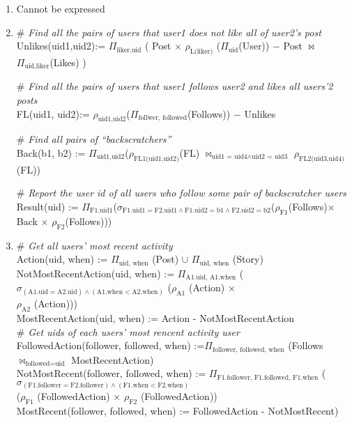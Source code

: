 \documentclass[letter, 9pt]{article}
\begin{document}
\begin{enumerate}
    \item Cannot be expressed

    \item {\color{gray} \# \textit{Find all the pairs of users that user1 does not like all of user2's post}} \\
    Unlikes(uid1,uid2):=
    $\Pi_{\text{liker,uid}}$
    (
        Post $\times$ $\rho_{\text{L(liker)}}$ ($\Pi_{\text{uid}}$(User)) $-$ 
        Post $\bowtie$ $\Pi_{\text{uid,liker}}$(Likes)
    ) 
    
    {\color{gray} \# \textit{Find all the pairs of users that user1 follows user2 and likes all users'2 posts}} \\
    FL(uid1, uid2):= $\rho_{\text{uid1,uid2}}$($\Pi_{\text{follwer, followed}}$(Follows)) $-$ Unlikes
    
    {\color{gray} \# \textit{Find all pairs of “backscratchers”}} \\
    Back(b1, b2) := $\Pi_{\text{uid1,uid2}}$($\rho_{\text{FL1(uid1,uid2)}}$(FL) $\bowtie_{\text{uid1 = uid4}\land \text{uid2 = uid3}}$ $\rho_{\text{FL2(uid3,uid4)}}$(FL)) 
    
    
    {\color{gray} \# \textit{Report the user id of all users who follow some pair of backscratcher users} \\}
    Result(uid) := $\Pi_{\text{F1.uid1}}$($\sigma_{\text{F1.uid1}=\text{F2.uid1} \land \text{F1.uid2} = \text{b1}\land \text{F2.uid2} = \text{b2}}$($\rho_{\text{F1}}$(Follows)$\times$ Back $\times$ $\rho_{\text{F2}}$(Follows)))
    
    \item {\color{gray} \# \textit{Get all users' most recent activity}} \\
    Action(uid, when) := $\Pi_{\text{uid, when}}$ (Post) $\cup$ $\Pi_{\text{uid, when}}$ (Story) \\
    NotMostRecentAction(uid, when) := $\Pi_{\text{A1.uid, A1.when}}$ ($\sigma_{(\text{A1.uid} = \text{A2.uid}) \land (\text{A1.when} < \text{A2.when})}$  ($\rho_{\text{A1}}$ (Action) $\times$ \\ $\rho_{\text{A2}}$ (Action))) \\
    MostRecentAction(uid, when) := Action - NotMostRecentAction \\
    
    {\color{gray} \# \textit{Get uids of each users' most rencent activity user}} \\
    FollowedAction(follower, followed, when) :=$\Pi_{\text{follower, followed, when}}$ (Follows $\bowtie_{\text{followed=uid}}$ MostRecentAction) \\
    NotMostRecent(follower, followed, when) := $\Pi_{\text{F1.follower, F1.followed, F1.when}}$ ($\sigma_{(\text{F1.follower} = \text{F2.follower}) \land (\text{F1.when} < \text{F2.when})}$ \\ ($\rho_{\text{F1}}$ (FollowedAction) $\times$ $\rho_{\text{F2}}$ (FollowedAction)) \\
    MostRecent(follower, followed, when) := FollowedAction - NotMostRecent) \\
    

\end{enumerate}
\end{document}
